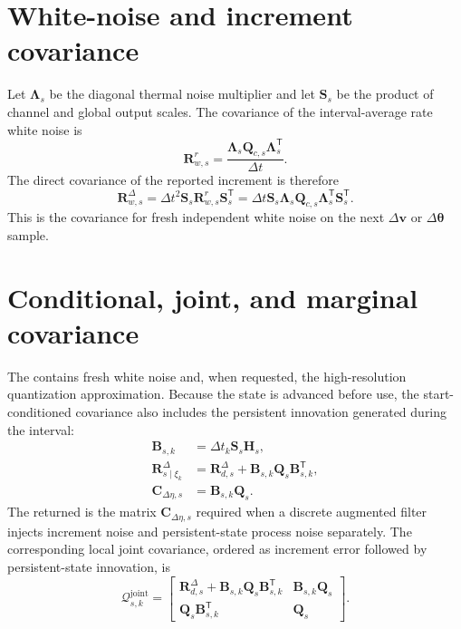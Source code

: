 \documentclass[11pt,oneside,headings=big]{scrreprt}
\newcommand{\vect}[1]{\bm{#1}}
\newcommand{\mat}[1]{\bm{#1}}
\begin{document}
    \section{White-noise and increment covariance}
    Let \(\mat\Lambda_s\) be the diagonal thermal noise multiplier and let
    \(\mat S_s\) be the product of channel and global output scales. The covariance
    of the interval-average rate white noise is
    \begin{equation}
        \mat R^r_{w,s}
        =\frac{\mat\Lambda_s\mat Q_{c,s}\mat\Lambda_s^{\mathsf T}}{\Delta t}.
        \label{eq:characterization-rate-covariance}
    \end{equation}
    The direct covariance of the reported increment is therefore
    \begin{equation}
        \mat R^\Delta_{w,s}
        =\Delta t^2\mat S_s\mat R^r_{w,s}\mat S_s^{\mathsf T}
        =\Delta t\mat S_s\mat\Lambda_s\mat Q_{c,s}
        \mat\Lambda_s^{\mathsf T}\mat S_s^{\mathsf T}.
        \label{eq:characterization-direct-covariance}
    \end{equation}
    This is the covariance for fresh independent white noise on the next
    \(\Delta\vect v\) or \(\Delta\vect\theta\) sample.


    \section{Conditional, joint, and marginal covariance}
    The  contains fresh white noise and,
    when requested, the high-resolution quantization approximation. Because the
    state is advanced before use, the start-conditioned covariance also includes
    the persistent innovation generated during the interval:
    \begin{align}
        \mat B_{s,k}&=\Delta t_k\mat S_s\mat H_s,\\
        \mat R^\Delta_{s\mid\xi_k}
        &=\mat R^\Delta_{d,s}+\mat B_{s,k}\mat Q_s\mat B_{s,k}^{\mathsf T},\\
        \mat C_{\Delta\eta,s}&=\mat B_{s,k}\mat Q_s.
        \label{eq:characterization-joint-blocks}
    \end{align}
    The returned  is the
    matrix $\mat C_{\Delta\eta,s}$ required when a discrete augmented filter
    injects increment noise and persistent-state process noise separately.
    The corresponding local joint covariance, ordered as increment error followed
    by persistent-state innovation, is
    \begin{equation}
        \mat{\mathcal Q}_{s,k}^{\mathrm{joint}}=
        \begin{bmatrix}
            \mat R^\Delta_{d,s}+\mat B_{s,k}\mat Q_s\mat B_{s,k}^{\mathsf T}
            &\mat B_{s,k}\mat Q_s\\
            \mat Q_s\mat B_{s,k}^{\mathsf T}&\mat Q_s
        \end{bmatrix}.
        \label{eq:characterization-joint}
    \end{equation}
\end{document}
